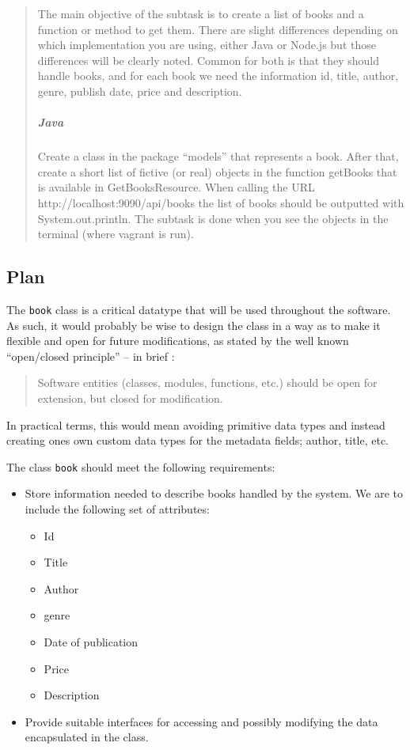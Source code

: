 \begin{quote}
  The main objective of the subtask is to create a list of books and a function
  or method to get them. There are slight differences depending on which
  implementation you are using, either Java or Node.js but those differences
  will be clearly noted. Common for both is that they should handle books,
  and for each book we need the information id, title, author, genre, publish
  date, price and description.

  \subparagraph{Java}
  Create a class in the package ``models'' that represents a book. After
  that, create a short list of fictive (or real) objects in the function
  getBooks that is available in GetBooksResource. When calling the URL
  http://localhost:9090/api/books the list of books should be outputted
  with System.out.println. The subtask is done when you see the objects in
  the terminal (where vagrant is run).
\end{quote}


\subsection{Plan}\label{task-1a-plan}
The \texttt{book} class is a critical datatype that will be used throughout the
software. As such, it would probably be wise to design the class in a way as to
make it flexible and open for future modifications, as stated by the well known
``open/closed principle'' \cite{Martin:1996:OPS} -- in brief
\cite{SOLID:OCP:Meyer}:

\begin{quote}
  Software entities (classes, modules, functions, etc.) should be open for
  extension, but closed for modification.
\end{quote}

In practical terms, this would mean avoiding primitive data types and instead
creating ones own custom data types for the metadata fields; author, title,
etc.


The class \texttt{book} should meet the following requirements:

\begin{itemize}
  \item Store information needed to describe books handled by the system.
        We are to include the following set of attributes:

  \begin{itemize}
    \item Id
    \item Title
    \item Author
    \item genre
    \item Date of publication
    \item Price
    \item Description
  \end{itemize}

  \item Provide suitable interfaces for accessing and possibly modifying the 
        data encapsulated in the class.
\end{itemize}

